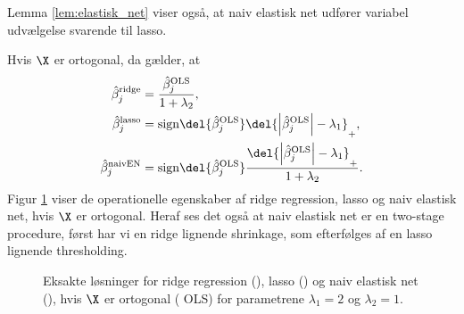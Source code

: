 Lemma \ref{lem:elastisk_net} viser også, at naiv  elastisk net udfører variabel udvælgelse svarende til lasso.
%
\begin{lem}
Hvis \(\X\) er ortogonal, da gælder, at
\begin{align}
\hat{\beta}_j^\text{ridge} &= \frac{\hat{\beta}_j^\text{OLS}}{1+\lambda_2}, \label{eq:orto_ridge} \\
\hat{\beta}_j^\text{lasso} &= \text{sign} \del{\hat{\beta}_j^\text{OLS}} \del{\left\vert \hat{\beta}_j^\text{OLS} \right\vert - \lambda_1}_+, \label{eq:orto_lasso} \\
\hat{\beta}_j^\text{naivEN} &= \text{sign} \del{\hat{\beta}_j^\text{OLS}} \frac{\del{\left\vert \hat{\beta}_j^\text{OLS} \right\vert - \lambda_1}_+}{1+\lambda_2}. \label{eq:orto_naivEN}
\end{align}
Figur \ref{fig:elastisk2} viser de operationelle egenskaber af ridge regression, lasso og naiv elastisk net, hvis \(\X\) er ortogonal. Heraf ses det også at naiv elastisk net er en two-stage procedure, først har vi en ridge lignende shrinkage, som efterfølges af en lasso lignende thresholding.
%
\begin{figure}[H]
\centering
\scalebox{0.8}{}
\caption[optional short text]{Eksakte løsninger for ridge regression (), lasso () og naiv elastisk net (), hvis \(\X\) er ortogonal ( OLS) for parametrene \(\lambda_1=2\) og \(\lambda_2=1\).} \label{fig:elastisk2}
\end{figure}
%
\end{lem}
%
